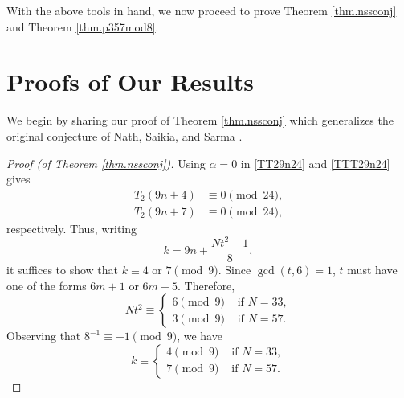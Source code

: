 \documentclass{amsart}
\theoremstyle{definition}
\newcommand{\james}[1]{{\color{red!80!black}\sffamily #1}}
\begin{document}
With the above tools in hand, we now proceed to prove Theorem \ref{thm.nssconj} and Theorem \ref{thm.p357mod8}. 

\section{Proofs of Our Results}\label{sec:ourproofs}

We begin by sharing our proof of Theorem \ref{thm.nssconj} which generalizes the original conjecture of Nath, Saikia, and Sarma \cite{Nath-Saikia-Sarma}.  

\begin{proof}[Proof (of Theorem \ref{thm.nssconj})]
Using $\alpha=0$ in \eqref{TT29n24} and \eqref{TTT29n24} gives
\begin{align*}
    T_2(9n+4)&\equiv 0\pmod{24},\\
    T_2(9n+7)&\equiv0\pmod{24},
\end{align*}
respectively. Thus, writing $$k=9n+\frac{Nt^2-1}{8},$$
it suffices to show that $k\equiv4 \text{ or } 7\pmod 9$. Since $\gcd(t,6)=1$, $t$ must have one of the forms $6m+1 \text{ or } 6m+5$. Therefore, 
\[
Nt^2 \equiv\begin{cases}
    6 \pmod{9} & \text{ if } N=33,\\
    3\pmod{9} & \text{ if } N=57.
\end{cases}
\]
Observing that $8^{-1}\equiv-1\pmod{9}$, we have  
\[
k\equiv \begin{cases}
    4 \pmod{9} & \text{ if } N=33,\\
    7\pmod{9} & \text{ if } N=57.
\end{cases}
\]\end{proof}

\end{document}

